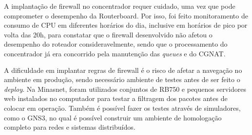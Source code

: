     A implantação de firewall no concentrador requer cuidado, uma vez que pode comprometer o desempenho da Routerboard. Por isso, foi feito monitoramento de consumo de CPU em diferentes horários do dia, inclusive em horários de pico por volta das 20h, para constatar que o firewall desenvolvido não afetou o desempenho do roteador consideravelmente, sendo que o processamento do concentrador já era concorrido pela manutenção das \textit{queues} e do CGNAT.
    
    A dificuldade em implantar regras de firewall é o risco de afetar a navegação no ambiente em produção, sendo necessário ambiente de testes antes de ser feito o \textit{deploy}. Na Minasnet, foram utilizados conjuntos de RB750 e pequenos servidores web instalados no computador para testar a filtragem dos pacotes antes de colocar em operação. Também é possível fazer os testes através de simuladores, como o GNS3, no qual é possível construir um ambiente de homologação completo para redes e sistemas distribuídos.
    